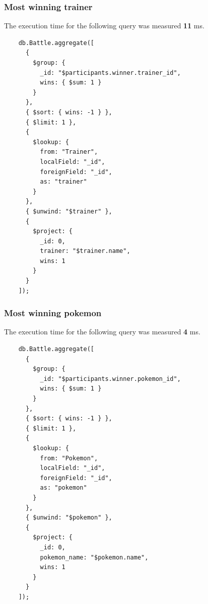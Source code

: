 \documentclass[11pt]{article}
\begin{document}
    \subsubsection{Most winning trainer}
    The execution time for the following query was measured \textbf{11} ms.
    \begin{lstlisting}
    db.Battle.aggregate([
      {
        $group: {
          _id: "$participants.winner.trainer_id",
          wins: { $sum: 1 }
        }
      },
      { $sort: { wins: -1 } },
      { $limit: 1 },
      {
        $lookup: {
          from: "Trainer",
          localField: "_id",
          foreignField: "_id",
          as: "trainer"
        }
      },
      { $unwind: "$trainer" },
      {
        $project: {
          _id: 0,
          trainer: "$trainer.name",
          wins: 1
        }
      }
    ]);
    \end{lstlisting}

    \subsubsection{Most winning pokemon}
    The execution time for the following query was measured \textbf{4} ms.
    \begin{lstlisting}
    db.Battle.aggregate([
      {
        $group: {
          _id: "$participants.winner.pokemon_id",
          wins: { $sum: 1 }
        }
      },
      { $sort: { wins: -1 } },
      { $limit: 1 },
      {
        $lookup: {
          from: "Pokemon",
          localField: "_id",
          foreignField: "_id",
          as: "pokemon"
        }
      },
      { $unwind: "$pokemon" },
      {
        $project: {
          _id: 0,
          pokemon_name: "$pokemon.name",
          wins: 1
        }
      }
    ]);
    \end{lstlisting}
\end{document}
